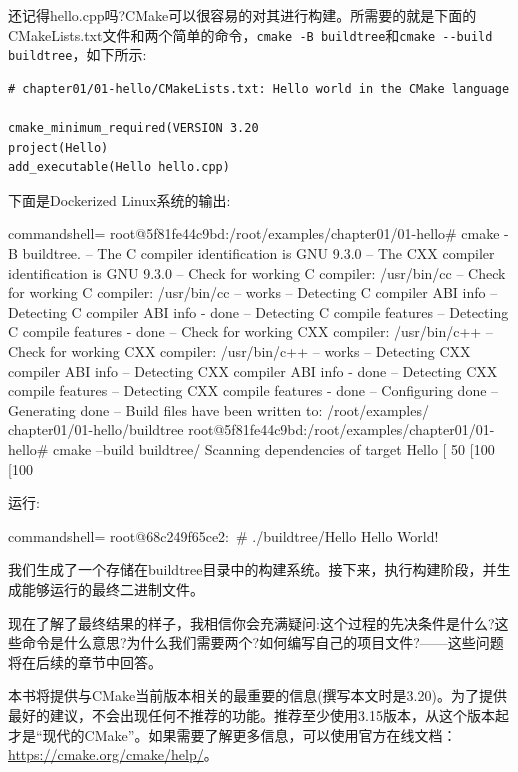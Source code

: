 还记得hello.cpp吗?CMake可以很容易的对其进行构建。所需要的就是下面的CMakeLists.txt文件和两个简单的命令，\texttt{cmake -B buildtree}和\texttt{cmake -{}-build buildtree}，如下所示:

\begin{lstlisting}[style=styleCMake]
# chapter01/01-hello/CMakeLists.txt: Hello world in the CMake language
	
cmake_minimum_required(VERSION 3.20
project(Hello)
add_executable(Hello hello.cpp)
\end{lstlisting}

下面是Dockerized Linux系统的输出:

\begin{tcblisting}{commandshell={}}
root@5f81fe44c9bd:/root/examples/chapter01/01-hello# cmake
-B buildtree.
-- The C compiler identification is GNU 9.3.0
-- The CXX compiler identification is GNU 9.3.0
-- Check for working C compiler: /usr/bin/cc
-- Check for working C compiler: /usr/bin/cc -- works
-- Detecting C compiler ABI info
-- Detecting C compiler ABI info - done
-- Detecting C compile features
-- Detecting C compile features - done
-- Check for working CXX compiler: /usr/bin/c++
-- Check for working CXX compiler: /usr/bin/c++ -- works
-- Detecting CXX compiler ABI info
-- Detecting CXX compiler ABI info - done
-- Detecting CXX compile features
-- Detecting CXX compile features - done
-- Configuring done
-- Generating done
-- Build files have been written to: /root/examples/
chapter01/01-hello/buildtree
root@5f81fe44c9bd:/root/examples/chapter01/01-hello# cmake
--build buildtree/
Scanning dependencies of target Hello
[ 50%
[100%
[100%
\end{tcblisting}

运行:

\begin{tcblisting}{commandshell={}}
root@68c249f65ce2:~# ./buildtree/Hello
Hello World!
\end{tcblisting}

我们生成了一个存储在buildtree目录中的构建系统。接下来，执行构建阶段，并生成能够运行的最终二进制文件。

现在了解了最终结果的样子，我相信你会充满疑问:这个过程的先决条件是什么?这些命令是什么意思?为什么我们需要两个?如何编写自己的项目文件?——这些问题将在后续的章节中回答。

\begin{tcolorbox}[colback=blue!5!white,colframe=blue!75!black,title=寻求帮助]
本书将提供与CMake当前版本相关的最重要的信息(撰写本文时是3.20)。为了提供最好的建议，不会出现任何不推荐的功能。推荐至少使用3.15版本，从这个版本起才是“现代的CMake”。如果需要了解更多信息，可以使用官方在线文档：\url{https://cmake.org/cmake/help/}。
\end{tcolorbox}



















